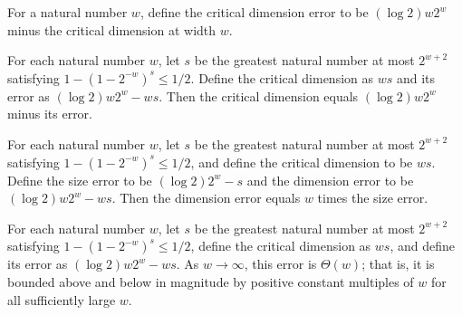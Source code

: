 \begin{definition}
\label{FABL.tribesCriticalDimensionError}
\leanok
{}
For a natural number $w$, define the critical dimension error to be $(\log 2)w2^w$ minus
the critical dimension at width $w$.
\end{definition}

\begin{theorem}
\label{FABL.tribesCriticalDimension_eq_main_sub_error}
\leanok
{}
For each natural number $w$, let $s$ be the greatest natural number at most $2^{w+2}$
satisfying $1-(1-2^{-w})^s\le 1/2$. Define the critical dimension as $ws$ and its error
as $(\log 2)w2^w-ws$. Then the critical dimension equals $(\log 2)w2^w$ minus its error.
\end{theorem}

\begin{theorem}
\label{FABL.tribesCriticalDimensionError_eq}
\leanok
{}
For each natural number $w$, let $s$ be the greatest natural number at most $2^{w+2}$
satisfying $1-(1-2^{-w})^s\le 1/2$, and define the critical dimension to be $ws$. Define
the size error to be $(\log 2)2^w-s$ and the dimension error to be $(\log 2)w2^w-ws$.
Then the dimension error equals $w$ times the size error.
\end{theorem}

\begin{theorem}
\label{FABL.tribesCriticalDimensionError_isTheta_natCast}
\leanok
{}
For each natural number $w$, let $s$ be the greatest natural number at most $2^{w+2}$
satisfying $1-(1-2^{-w})^s\le 1/2$, define the critical dimension as $ws$, and define
its error as $(\log 2)w2^w-ws$. As $w\to\infty$, this error is $\Theta(w)$; that is, it
is bounded above and below in magnitude by positive constant multiples of $w$ for all
sufficiently large $w$.
\end{theorem}

